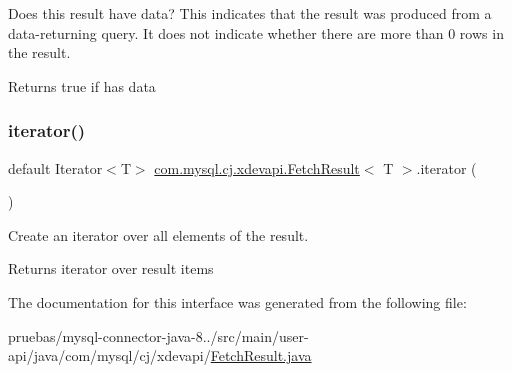 Does this result have data? This indicates that the result was produced from a data-\/returning query. It does not indicate whether there are more than 0 rows in the result.

\begin{DoxyReturn}{Returns}
true if has data 
\end{DoxyReturn}
\mbox{\label{interfacecom_1_1mysql_1_1cj_1_1xdevapi_1_1_fetch_result_a98165eec59f65bc0dfb8e96b9ddce40c}} 
\subsubsection{\texorpdfstring{iterator()}{iterator()}}
{\footnotesize\ttfamily default Iterator$<$T$>$ \mbox{\hyperlink{interfacecom_1_1mysql_1_1cj_1_1xdevapi_1_1_fetch_result}{com.\+mysql.\+cj.\+xdevapi.\+Fetch\+Result}}$<$ T $>$.iterator (\begin{DoxyParamCaption}{ }\end{DoxyParamCaption})}

Create an iterator over all elements of the result.

\begin{DoxyReturn}{Returns}
iterator over result items 
\end{DoxyReturn}


The documentation for this interface was generated from the following file\+:\begin{DoxyCompactItemize}
\item 
pruebas/mysql-\/connector-\/java-\/8../src/main/user-\/api/java/com/mysql/cj/xdevapi/\mbox{\hyperlink{_fetch_result_8java}{Fetch\+Result.\+java}}\end{DoxyCompactItemize}
